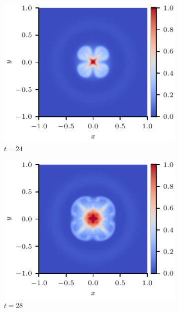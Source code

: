\documentclass[fleqn,usenatbib]{mnras}
\begin{document}
\begin{figure}
  \centering
    \begin{subfigure}{0.32\textwidth}
      \includegraphics[width=\linewidth]{swi-3_pressure_12.pdf}
      \caption{$t=24$}
      \label{fig:swi-3_pressure_12}
    \end{subfigure}
    \hfill
    \begin{subfigure}{0.32\textwidth}
      \includegraphics[width=\linewidth]{swi-3_pressure_14.pdf}
      \caption{$t=28$}
      \label{fig:swi-3_pressure_14}
    \end{subfigure}
    \hfill
    \begin{subfigure}{0.32\textwidth}

\end{subfigure}
\end{figure}
\end{document}
